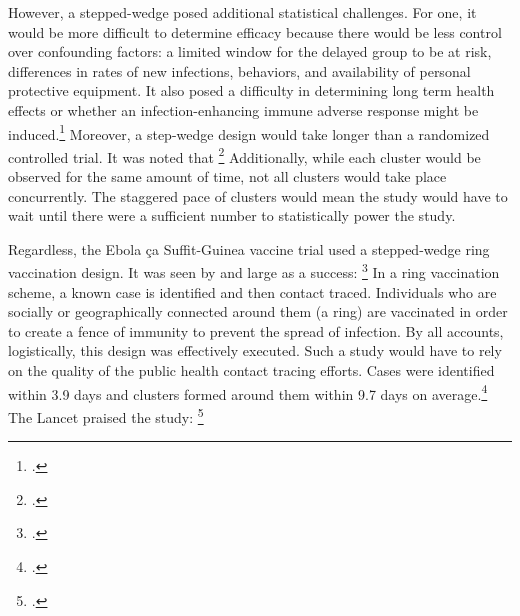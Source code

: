 \documentclass[letterpaper,notitlepage,12pt]{article}
\begin{document}
However, a stepped-wedge posed additional statistical challenges.
For one, it would be more difficult to determine efficacy because there would be
less control over confounding factors: a limited window for the delayed
group to be at risk, differences in rates of new infections, behaviors, and
availability of personal protective equipment.
It also posed a difficulty in determining long term health effects or whether an 
infection-enhancing immune adverse response might be induced.\footcite[p. 116]
{NAP}
Moreover, a step-wedge design would take longer than a randomized controlled
trial.
It was noted that \footcite{ebola
ca suffit ring vaccintation trial consortium, 2015}
Additionally, while each cluster would be observed for the same amount of time, 
not all clusters would take place concurrently.
The staggered pace of clusters would mean the study would have to wait
until there were a sufficient number to
statistically power the study. 

Regardless, the Ebola \c{c}a Suffit-Guinea vaccine trial used a stepped-wedge
ring vaccination design.
It was seen by and large as a success: \footcite{NAP}
In a ring vaccination scheme, a known case is identified and then contact
traced.
Individuals who are socially or geographically connected around them (a ring)
are vaccinated in order to create a fence of immunity to prevent the spread of
infection.
By all accounts, logistically, this design was effectively executed.
Such a study would have to rely on the quality of the public health contact
tracing efforts.
Cases were identified within 3.9 days and clusters formed around them within 9.7
days on average.\footcite{HR 2016}
The Lancet praised the study: \footcite{lancet 2015}
\end{document}

